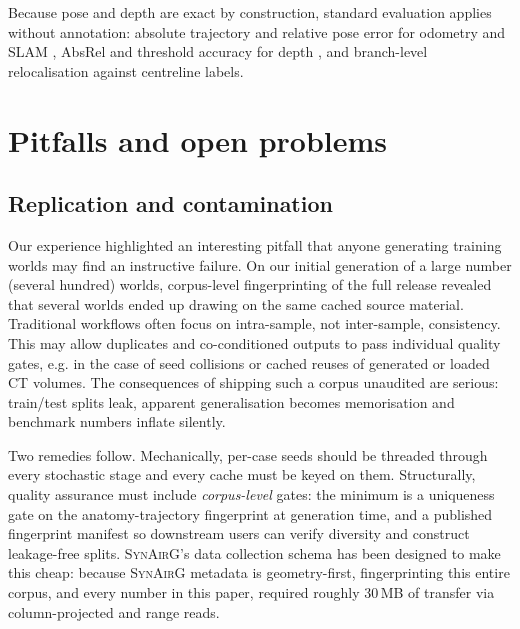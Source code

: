 \documentclass[conference]{IEEEtran}
\newcommand{\synairg}{\textsc{SynAirG}}
\begin{document}
Because pose and depth are exact by construction, standard evaluation applies without annotation: absolute trajectory and relative pose error for odometry and SLAM \cite{sturm2012tum}, AbsRel and threshold accuracy for depth \cite{eigen2014depth}, and branch-level relocalisation against centreline labels.

\section{Pitfalls and open problems}
\label{sec:pitfalls}
\subsection{Replication and contamination}
Our experience highlighted an interesting pitfall that anyone generating training worlds may find an instructive failure. On our initial generation of a large number (several hundred) worlds, corpus-level fingerprinting of the full release revealed that several worlds ended up drawing on the same cached source material. Traditional workflows often focus on intra-sample, not inter-sample, consistency. This may allow duplicates and co-conditioned outputs to pass individual quality gates, e.g. in the case of seed collisions or cached reuses of generated or loaded CT volumes. The consequences of shipping such a corpus unaudited are serious: train/test splits leak, apparent generalisation becomes memorisation and benchmark numbers inflate silently.

Two remedies follow. Mechanically, per-case seeds should be threaded through every stochastic stage and every cache must be keyed on them. Structurally, quality assurance must include \emph{corpus-level} gates: the minimum is a uniqueness gate on the anatomy-trajectory fingerprint at generation time, and a published fingerprint manifest so downstream users can verify diversity and construct leakage-free splits. \synairg{}'s data collection schema has been designed to make this cheap: because \synairg{} metadata is geometry-first, fingerprinting this entire corpus, and every number in this paper, required roughly 30\,MB of transfer via column-projected and range reads.
\end{document}
